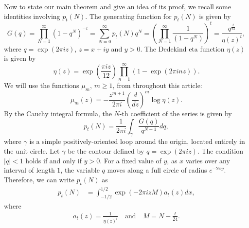 \documentclass[10pt,a4paper]{amsart}
\numberwithin{equation}{section}
\begin{document}
	Now to state our main theorem and give an idea of its proof, we recall some identities involving $p_t(N)$. 
	The generating function for $p_{t}(N)$ is given by
	\begin{equation*}
		G(q)=\prod_{N=1}^\infty \left(1-q^{N}\right)^{-t}=\sum_{N=0}^{\infty}p_t(N)q^{N}=\left(\prod_{N=1}^\infty \frac{1}{\left(1-q^{N}\right)}\right)^{t}=\frac{q^{\frac{t}{24}}}{\eta(z)^{t}}, 
	\end{equation*}
	where $q=\exp(2\pi iz)$, $z=x+iy$ and $y>0$. The Dedekind eta function $\eta(z)$ is given by 
	\begin{equation*}
		\eta(z)=\exp\left(\frac{\pi iz}{12}\right)\prod_{n=1}^{\infty}(1-\exp(2\pi inz)).  
	\end{equation*}
	We will use the functions $\mu_m$, $m\ge 1$, from \cite{tyler2026asymptotics} throughout this article:
	\begin{equation}\label{eq-muk}
		\mu_{m}(z)=-\frac{z^{m+1}}{2\pi i} \left(\frac{d}{dz}\right)^{m} \log\eta(z).
	\end{equation}
	By the Cauchy integral formula, the $N$-th coefficient of the series is given by
	\begin{equation*}
		p_{t}(N)=\frac{1}{2\pi i}\int_{\gamma}\frac{G(q)}{q^{N+1}}dq, 
	\end{equation*}
	where $\gamma$ is a simple positively-oriented loop around the origin, located entirely in the unit circle. Let $\gamma$ be the contour defined by $q=\exp(2\pi i z)$. The condition $|q|<1$ holds if and only if $y>0$. For a fixed value of $y$, as $x$ varies over any interval of length $1$, the variable $q$ moves along a full circle of radius $e^{-2\pi y}$. Therefore, we can write $p_t(N)$ as
	\begin{align}\label{eq-integral}
		p_{t}(N)&=\int_{-1/2}^{1/2} \exp\left( -2\pi izM\right)a_{t}(z)dx,
	\end{align}
	where 
	\begin{align*}%
		a_{t}(z)=\frac{1}{\eta(z)^{t}}\quad\text{and}\quad M=N-\frac{t}{24}.
	\end{align*}	
	
\end{document}
